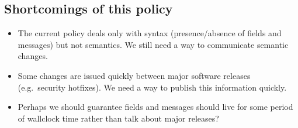 \documentclass{article}
\begin{document}
\subsection{Shortcomings of this policy}
\begin{itemize}
\item The current policy deals only with syntax (presence/absence of fields and messages) but not semantics. We still need a way to communicate semantic changes.
\item Some changes are issued quickly between major software releases (e.g.\ security hotfixes). We need a way to publish this information quickly.

\item Perhaps we should guarantee fields and messages should live for some period of wallclock time rather than talk about major releases?
\end{itemize}


\end{document}
